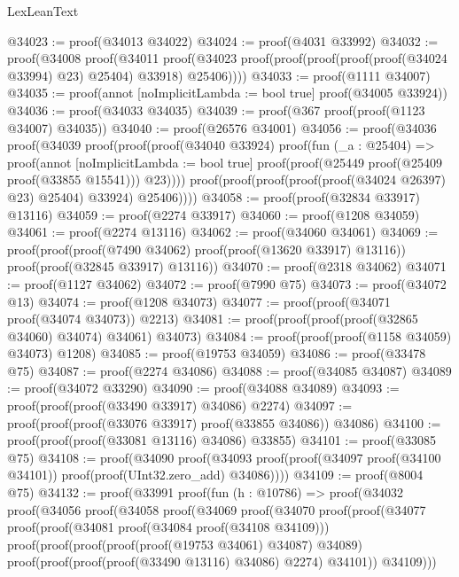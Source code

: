 \begin{lexlean}{LexLeanText}
\begin{coremodule}
@34023 := proof(@34013 @34022)
@34024 := proof(@4031 @33992)
@34032 := proof(@34008
      proof(@34011
          proof(@34023 proof(proof(proof(proof(proof(@34024 @33994) @23) @25404) @33918) @25406))))
@34033 := proof(@1111 @34007)
@34035 := proof(annot [noImplicitLambda := bool true] proof(@34005 @33924))
@34036 := proof(@34033 @34035)
@34039 := proof(@367 proof(proof(@1123 @34007) @34035))
@34040 := proof(@26576 @34001)
@34056 := proof(@34036
      proof(@34039
          proof(proof(proof(@34040 @33924)
                proof(fun (_a : @25404) =>
                  proof(annot [noImplicitLambda := bool true]
                    proof(proof(@25449 proof(@25409 proof(@33855 @15541))) @23))))
              proof(proof(proof(proof(proof(@34024 @26397) @23) @25404) @33924) @25406))))
@34058 := proof(proof(@32834 @33917) @13116)
@34059 := proof(@2274 @33917)
@34060 := proof(@1208 @34059)
@34061 := proof(@2274 @13116)
@34062 := proof(@34060 @34061)
@34069 := proof(proof(proof(@7490 @34062) proof(proof(@13620 @33917) @13116))
      proof(proof(@32845 @33917) @13116))
@34070 := proof(@2318 @34062)
@34071 := proof(@1127 @34062)
@34072 := proof(@7990 @75)
@34073 := proof(@34072 @13)
@34074 := proof(@1208 @34073)
@34077 := proof(proof(@34071 proof(@34074 @34073)) @2213)
@34081 := proof(proof(proof(proof(@32865 @34060) @34074) @34061) @34073)
@34084 := proof(proof(proof(@1158 @34059) @34073) @1208)
@34085 := proof(@19753 @34059)
@34086 := proof(@33478 @75)
@34087 := proof(@2274 @34086)
@34088 := proof(@34085 @34087)
@34089 := proof(@34072 @33290)
@34090 := proof(@34088 @34089)
@34093 := proof(proof(proof(@33490 @33917) @34086) @2274)
@34097 := proof(proof(proof(@33076 @33917) proof(@33855 @34086)) @34086)
@34100 := proof(proof(proof(@33081 @13116) @34086) @33855)
@34101 := proof(@33085 @75)
@34108 := proof(@34090
      proof(@34093 proof(proof(@34097 proof(@34100 @34101)) proof(proof(UInt32.zero_add) @34086))))
@34109 := proof(@8004 @75)
@34132 := proof(@33991
      proof(fun (h : @10786) =>
        proof(@34032
            proof(@34056
                proof(@34058
                    proof(@34069
                        proof(@34070
                            proof(proof(@34077
                                  proof(proof(@34081 proof(@34084 proof(@34108 @34109)))
                                      proof(proof(proof(proof(proof(@19753 @34061) @34087) @34089)
                                            proof(proof(proof(proof(@33490 @13116) @34086) @2274)
                                                @34101))
                                          @34109)))

\end{coremodule}
\end{lexlean}
